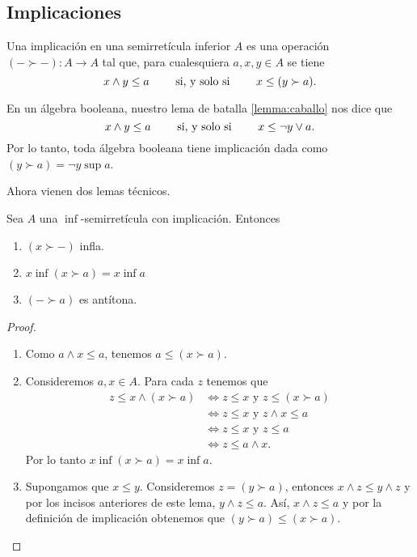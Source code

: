 \subsection{Implicaciones}

Una implicación en una semirretícula inferior $A$ es una operación
$(-\succ -)\colon A\rightarrow A$ tal que, para cualesquiera $a,x,y\in A$ se tiene
\[
  x\wedge y\leq a \qquad\text{ si, y solo si }\qquad x\leq (y\succ a )
.\]

\begin{example}
  En un álgebra booleana, nuestro lema de batalla \ref{lemma:caballo} nos dice que
  \[
    x\wedge y\leq a \qquad\text{ si, y solo si }\qquad
    x\leq \neg y\vee a
  .\]
  Por lo tanto, toda álgebra booleana tiene implicación dada
  como $(y\succ a)=\neg y\sup a$.
\end{example}

Ahora vienen dos lemas técnicos.
\begin{lemma}\label{imp}
  Sea $A$ una $\inf$-semirretícula con implicación.
  Entonces
  \begin{enumerate}
    \item $(x\succ -)$ infla.
    \item $x\inf(x\succ a) = x\inf a$
    \item $(-\succ a)$ es antítona.
  \end{enumerate}
\end{lemma}
\begin{proof}
    \begin{enumerate}
        \item Como $a\wedge x\leq a$, tenemos
        $a\leq (x\succ a).$
        \item Consideremos $a, x\in A$.
        Para cada $z$ tenemos que 
        \begin{align*}
            z\leq x\wedge (x\succ a)
            & \iff z\leq x \mbox{ y } z\leq (x\succ a)\\
            & \iff z\leq x \mbox{ y } z\wedge x\leq a\\
            & \iff z\leq x \mbox{ y } z\leq a\\
            & \iff z\leq a\wedge x.
        \end{align*}
        Por lo tanto $x\inf(x\succ a) = x\inf a$.
        \item Supongamos que $x\leq y$. Consideremos $z=(y\succ a)$, entonces $x\wedge z\leq y\wedge z$ y por los incisos anteriores de este lema, $y\wedge z\leq a$. Así, $x\wedge z\leq a$ y por la definición de implicación obtenemos que $(y\succ a)\leq (x\succ a)$. 
    \end{enumerate}
\end{proof}

